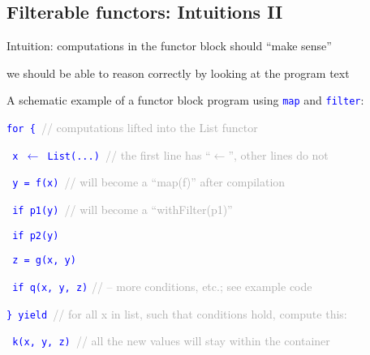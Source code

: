 \subsection{Filterable functors: Intuitions II}

Intuition: computations in the functor block should ``make sense''

we should be able to reason correctly by looking at the program text

A schematic example of a functor block program using \texttt{\textcolor{blue}{\footnotesize{}map}}
and \texttt{\textcolor{blue}{\footnotesize{}filter}}:

\texttt{\textcolor{blue}{\footnotesize{}for \{ }}\textcolor{darkgray}{\footnotesize{}//
computations lifted into the List functor}{\footnotesize\par}

\texttt{\textcolor{blue}{\footnotesize{}  x $\leftarrow$ List(...)
}}\textcolor{darkgray}{\footnotesize{}// the first line has ``$\leftarrow$'',
other lines do not}{\footnotesize\par}

\texttt{\textcolor{blue}{\footnotesize{}  y = f(x) }}\textcolor{darkgray}{\footnotesize{}//
will become a ``map(f)'' after compilation}{\footnotesize\par}

\texttt{\textcolor{blue}{\footnotesize{}  if p1(y) }}\textcolor{darkgray}{\footnotesize{}//
will become a ``withFilter(p1)''}{\footnotesize\par}

\texttt{\textcolor{blue}{\footnotesize{}  if p2(y)}}{\footnotesize\par}

\texttt{\textcolor{blue}{\footnotesize{}  z = g(x, y)}}{\footnotesize\par}

\texttt{\textcolor{blue}{\footnotesize{}  if q(x, y, z)}}\textcolor{darkgray}{\footnotesize{}
// – more conditions, etc.; see example code}{\footnotesize\par}

\texttt{\textcolor{blue}{\footnotesize{}\} yield }}\textcolor{darkgray}{\footnotesize{}//
 for all x in list, such that conditions hold, compute this:}{\footnotesize\par}

\texttt{\textcolor{blue}{\footnotesize{}  k(x, y, z) }}\textcolor{darkgray}{\footnotesize{}//
 all the new values will stay within the container}{\footnotesize\par}

